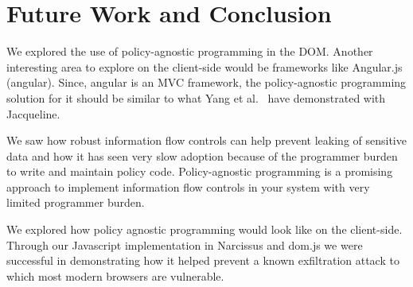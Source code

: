 \chapter{Future Work and Conclusion}
We explored the use of policy-agnostic programming in the DOM. Another interesting
area to explore on the client-side would be frameworks like Angular.js (angular).
Since, angular is an MVC framework, the policy-agnostic programming solution for it
should be similar to what Yang et al.~\cite{Jacqueline} have demonstrated with Jacqueline.

We saw how robust information flow controls can help prevent leaking of sensitive
data and how it has seen very slow adoption because of the programmer burden to
write and maintain policy code. Policy-agnostic programming is a promising approach
to implement information flow controls in your system with very limited programmer
burden.

We explored how policy agnostic programming would look like on the client-side.
Through our Javascript implementation in Narcissus and dom.js we were successful
in demonstrating how it helped prevent a known exfiltration attack to which most
modern browsers are vulnerable.
